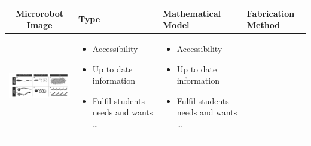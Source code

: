 \documentclass[a4paper,11pt]{article}
\begin{document}
\begin{sloppypar}
\begin{table}[h!]
  \begin{tabular}{ c | m{3cm} | m{3cm} | m{3cm} }
    \hline
\rowcolor{lightgray}
    Microrobot Image & Type  & Mathematical Model & Fabrication Method \\ \hline\hline
    \begin{minipage}{.3\textwidth}
      \includegraphics[width=\linewidth, height=20mm]{cilia}
    \end{minipage}
    &
      \begin{itemize}
        \item Accessibility
        \item Up to date information
        \item Fulfil students needs and wants \ldots
      \end{itemize}
    & 
      \begin{itemize}
        \item Accessibility
        \item Up to date information
        \item Fulfil students needs and wants \ldots
      \end{itemize}
    \\ \hline


\end{tabular}
\end{table}
\end{sloppypar}
\end{document}
